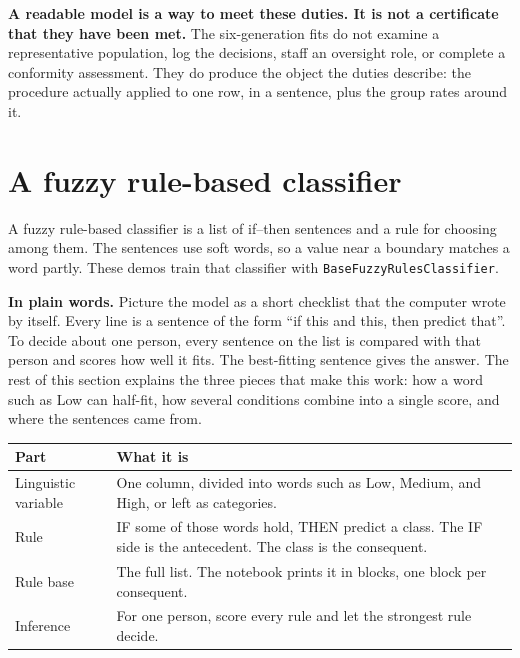 \documentclass[11pt]{article}
\newcommand{\fn}[1]{\texttt{\small #1}}
\begin{document}
\begin{careful}
\textbf{A readable model is a way to meet these duties. It is not a certificate that they have been met.} The six-generation fits do not examine a representative population, log the decisions, staff an oversight role, or complete a conformity assessment. They do produce the object the duties describe: the procedure actually applied to one row, in a sentence, plus the group rates around it.
\end{careful}

\section{A fuzzy rule-based classifier}
\label{sec:rules}

A fuzzy rule-based classifier is a list of if--then sentences and a rule for choosing among them. The sentences use soft words, so a value near a boundary matches a word partly. These demos train that classifier with \fn{BaseFuzzyRulesClassifier}.

\begin{plainwords}
\textbf{In plain words.} Picture the model as a short checklist that the computer wrote by itself. Every line is a sentence of the form ``if this and this, then predict that''. To decide about one person, every sentence on the list is compared with that person and scores how well it fits. The best-fitting sentence gives the answer. The rest of this section explains the three pieces that make this work: how a word such as Low can half-fit, how several conditions combine into a single score, and where the sentences came from.
\end{plainwords}

\begin{table}[H]
\centering
\small
\begin{tabularx}{\textwidth}{@{}l Y@{}}
\toprule
Part & What it is \\
\midrule
Linguistic variable & One column, divided into words such as Low, Medium, and High, or left as categories. \\
Rule & IF some of those words hold, THEN predict a class. The IF side is the antecedent. The class is the consequent. \\
Rule base & The full list. The notebook prints it in blocks, one block per consequent. \\
Inference & For one person, score every rule and let the strongest rule decide. \\
\bottomrule
\end{tabularx}
\end{table}
\end{document}
